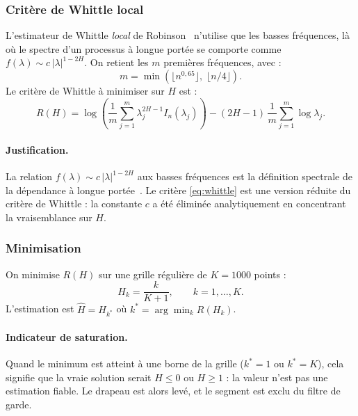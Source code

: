 \documentclass[11pt,a4paper]{article}
\theoremstyle{definition}
\newcommand{\code}[1]{\texttt{\detokenize{#1}}}
\begin{document}
\subsubsection{Critère de Whittle local}

L'estimateur de Whittle \emph{local} de Robinson~\cite{robinson1995} n'utilise que
les basses fréquences, là où le spectre d'un processus à longue portée se comporte
comme $f(\lambda) \sim c\,|\lambda|^{1-2H}$. On retient les $m$ premières
fréquences, avec :
\begin{equation}
  m = \min\left(\bigl\lfloor n^{0{,}65} \bigr\rfloor,\; \bigl\lfloor n/4 \bigr\rfloor \right).
  \label{eq:m-whittle}
\end{equation}
Le critère de Whittle à minimiser sur $H$ est :
\begin{equation}
  R(H) = \log\!\left(\frac{1}{m}\sum_{j=1}^{m} \lambda_j^{2H-1} I_n(\lambda_j)\right)
         - (2H-1)\,\frac{1}{m}\sum_{j=1}^{m} \log \lambda_j.
  \label{eq:whittle}
\end{equation}

\paragraph{Justification.} La relation $f(\lambda) \sim c\,|\lambda|^{1-2H}$ aux
basses fréquences est la définition spectrale de la dépendance à longue
portée~\cite{robinson1995}. Le critère \eqref{eq:whittle} est une version réduite
du critère de Whittle : la constante $c$ a été éliminée analytiquement en
concentrant la vraisemblance sur $H$.

\subsubsection{Minimisation}

On minimise $R(H)$ sur une grille régulière de $K = 1000$ points :
\[
  H_k = \frac{k}{K+1}, \qquad k = 1, \dots, K.
\]
L'estimation est $\hat H = H_{k^*}$ où $k^* = \arg\min_k R(H_k)$.

\paragraph{Indicateur de saturation.} Quand le minimum est atteint à une borne de
la grille ($k^* = 1$ ou $k^* = K$), cela signifie que la vraie solution serait
$H \leq 0$ ou $H \geq 1$ : la valeur n'est pas une estimation fiable. Le drapeau
\code{whittle_a_la_borne = True} est alors levé, et le segment est exclu du
filtre de garde.
\end{document}
